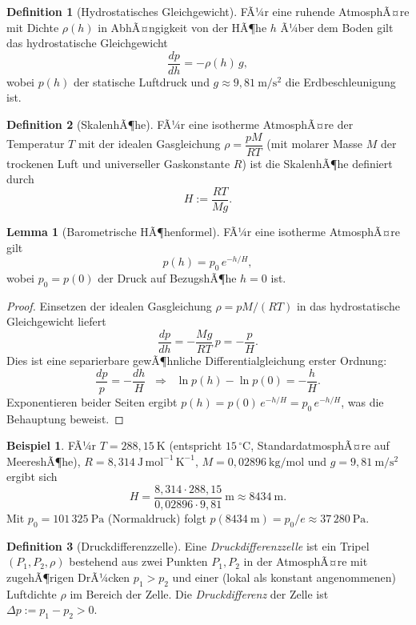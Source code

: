 ﻿\documentclass[a4paper,12pt]{article}
\theoremstyle{definition}
\newtheorem{definition}{Definition}
\newtheorem{beispiel}{Beispiel}
\newtheorem{lemma}{Lemma}
\begin{document}
\begin{definition}[Hydrostatisches Gleichgewicht]
	FÃ¼r eine ruhende AtmosphÃ¤re mit Dichte $\rho(h)$ in AbhÃ¤ngigkeit von
	der HÃ¶he $h$ Ã¼ber dem Boden gilt das hydrostatische Gleichgewicht
	\[
		\frac{dp}{dh} = -\rho(h)\, g,
	\]
	wobei $p(h)$ der statische Luftdruck und $g \approx 9{,}81\ \mathrm{m/s^2}$
	die Erdbeschleunigung ist.
\end{definition}

\begin{definition}[SkalenhÃ¶he]
	FÃ¼r eine isotherme AtmosphÃ¤re der Temperatur $T$ mit der idealen
	Gasgleichung $\rho = \dfrac{pM}{RT}$ (mit molarer Masse $M$ der
	trockenen Luft und universeller Gaskonstante $R$) ist die SkalenhÃ¶he
	definiert durch
	\[
		H := \frac{RT}{Mg}.
	\]
\end{definition}

\begin{lemma}[Barometrische HÃ¶henformel]
	\label{lem:barometrisch}
	FÃ¼r eine isotherme AtmosphÃ¤re gilt
	\[
		p(h) = p_0 \, e^{-h/H},
	\]
	wobei $p_0 = p(0)$ der Druck auf BezugshÃ¶he $h=0$ ist.
\end{lemma}

\begin{proof}
	Einsetzen der idealen Gasgleichung $\rho = pM/(RT)$ in das
	hydrostatische Gleichgewicht liefert
	\[
		\frac{dp}{dh} = -\frac{Mg}{RT}\, p = -\frac{p}{H}.
	\]
	Dies ist eine separierbare gewÃ¶hnliche Differentialgleichung erster
	Ordnung:
	\[
		\frac{dp}{p} = -\frac{dh}{H}
		\;\;\Longrightarrow\;\;
		\ln p(h) - \ln p(0) = -\frac{h}{H}.
	\]
	Exponentieren beider Seiten ergibt $p(h) = p(0)\, e^{-h/H} = p_0\,
	e^{-h/H}$, was die Behauptung beweist.
\end{proof}

\begin{beispiel}
	\label{bsp:skalenhoehe}
	FÃ¼r $T = 288{,}15\ \mathrm{K}$ (entspricht $15\,^\circ\mathrm{C}$,
	StandardatmosphÃ¤re auf MeereshÃ¶he), $R = 8{,}314\
	\mathrm{J\,mol^{-1}\,K^{-1}}$, $M = 0{,}02896\ \mathrm{kg/mol}$ und
	$g = 9{,}81\ \mathrm{m/s^2}$ ergibt sich
	\[
		H = \frac{8{,}314 \cdot 288{,}15}{0{,}02896 \cdot 9{,}81}\
		\mathrm{m} \approx 8434\ \mathrm{m}.
	\]
	Mit $p_0 = 101\,325\ \mathrm{Pa}$ (Normaldruck) folgt
	$p(8434\ \mathrm{m}) = p_0/e \approx 37\,280\ \mathrm{Pa}$.
\end{beispiel}

\begin{definition}[Druckdifferenzzelle]
	\label{def:zelle}
	Eine \emph{Druckdifferenzzelle} ist ein Tripel
	$(P_1, P_2, \rho)$ bestehend aus zwei Punkten $P_1, P_2$ in der
	AtmosphÃ¤re mit zugehÃ¶rigen DrÃ¼cken $p_1 > p_2$ und einer (lokal als
	konstant angenommenen) Luftdichte $\rho$ im Bereich der Zelle. Die
	\emph{Druckdifferenz} der Zelle ist $\Delta p := p_1 - p_2 > 0$.
\end{definition}
\end{document}
